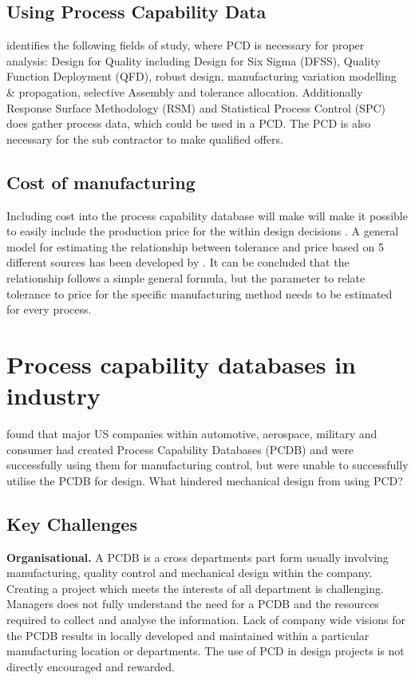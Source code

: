 \documentclass[aip,amsmath,reprint, author-year]{revtex4-1}
\begin{document}
\subsection{Using Process Capability Data}
\cite{kern2003forecasting} identifies the following fields of study, where PCD is necessary for proper analysis: Design for Quality including Design for Six Sigma (DFSS), Quality Function Deployment (QFD), robust design, manufacturing variation modelling \& propagation, selective Assembly and tolerance allocation. 
Additionally Response Surface Methodology (RSM) and Statistical Process Control (SPC) does gather process data, which could be used in a PCD. 
The PCD is also necessary for the sub contractor to make qualified offers.


\subsection{Cost of manufacturing}
Including cost into the process capability database will make will make it possible to easily include the production price for the within design decisions \citep{perzyk1998selection, thornton2000use}. 
A general model for estimating the relationship between tolerance and price based on 5 different sources has been developed by \cite{sfantsikopoulos1990cost}.
It can be concluded that the relationship follows a simple general formula, but the parameter to relate tolerance to price for the specific manufacturing method needs to be estimated for every process. 




\section{Process capability databases in industry}
\cite{tata1999effective, tata1999process} found that major US companies within automotive, aerospace, military and consumer had created Process Capability Databases (PCDB) and were successfully using them for manufacturing control, but were unable to successfully utilise the PCDB for design. What hindered mechanical design from using PCD? 

\subsection{Key Challenges}
\textbf{Organisational.}  A PCDB is a cross departments part form usually involving manufacturing, quality control and mechanical design within the company. 
Creating a project which meets the interests of all department is challenging. 
Managers does not fully understand the need for a PCDB and the resources required to collect and analyse the information. 
Lack of company wide visions for the PCDB results in locally developed and maintained within a particular manufacturing location or departments. 
The use of PCD in design projects is not directly encouraged and rewarded. 
\end{document}
